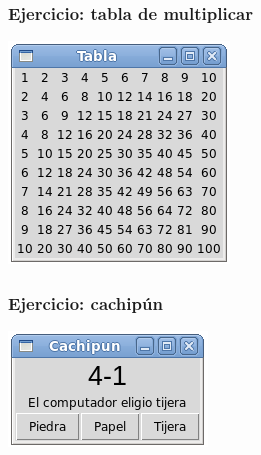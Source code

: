 \documentclass[12pt]{beamer}
\begin{document}
  \begin{frame}
    \label{ejercicio-tabla}
    \frametitle{Ejercicio: tabla de multiplicar}
    \begin{center}
      \includegraphics[width=.6\textwidth]{programas/tkinter/capturas/15.png}
    \end{center}
  \end{frame}

  \begin{frame}
    \label{ejercicio-cachipun}
    \frametitle{Ejercicio: cachipún}
    \begin{center}
      \includegraphics[width=.8\textwidth]{programas/tkinter/capturas/16.png}
    \end{center}
  \end{frame}
\end{document}
